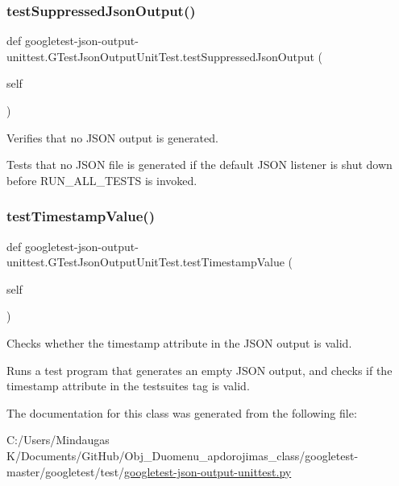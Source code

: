 \subsubsection{\texorpdfstring{testSuppressedJsonOutput()}{testSuppressedJsonOutput()}}
{\footnotesize\ttfamily def googletest-\/json-\/output-\/unittest.\+G\+Test\+Json\+Output\+Unit\+Test.\+test\+Suppressed\+Json\+Output (\begin{DoxyParamCaption}\item[{}]{self }\end{DoxyParamCaption})}

\begin{DoxyVerb}Verifies that no JSON output is generated.

Tests that no JSON file is generated if the default JSON listener is
shut down before RUN_ALL_TESTS is invoked.
\end{DoxyVerb}
 \mbox{\label{classgoogletest-json-output-unittest_1_1_g_test_json_output_unit_test_afceaa6545170996b286e610e31f2e403}} 
\subsubsection{\texorpdfstring{testTimestampValue()}{testTimestampValue()}}
{\footnotesize\ttfamily def googletest-\/json-\/output-\/unittest.\+G\+Test\+Json\+Output\+Unit\+Test.\+test\+Timestamp\+Value (\begin{DoxyParamCaption}\item[{}]{self }\end{DoxyParamCaption})}

\begin{DoxyVerb}Checks whether the timestamp attribute in the JSON output is valid.

Runs a test program that generates an empty JSON output, and checks if
the timestamp attribute in the testsuites tag is valid.
\end{DoxyVerb}
 

The documentation for this class was generated from the following file\+:\begin{DoxyCompactItemize}
\item 
C\+:/\+Users/\+Mindaugas K/\+Documents/\+Git\+Hub/\+Obj\+\_\+\+Duomenu\+\_\+apdorojimas\+\_\+class/googletest-\/master/googletest/test/\mbox{\hyperlink{googletest-master_2googletest_2test_2googletest-json-output-unittest_8py}{googletest-\/json-\/output-\/unittest.\+py}}\end{DoxyCompactItemize}
